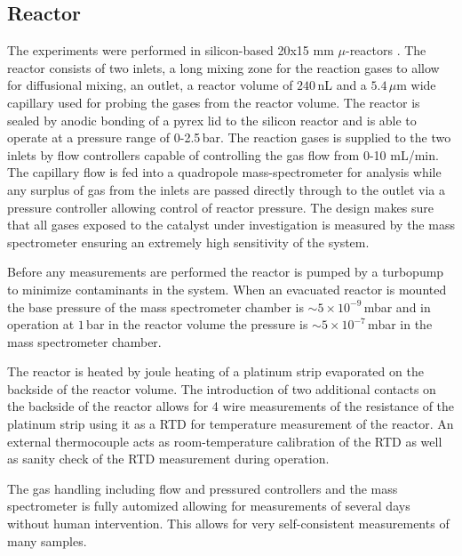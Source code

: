 \documentclass[8.5pt,twoside,twocolumn]{article}
\begin{document}
\subsection{Reactor}
The experiments were performed in silicon-based 20x15 mm $\mu$-reactors \cite{Henriksen2009}. The reactor consists of two inlets, a long mixing zone for the reaction gases to allow for diffusional mixing, an outlet, a reactor volume of $240\,$nL and a $5.4\,\mu$m wide capillary used for probing the gases from the reactor volume. The reactor is sealed by anodic bonding of a pyrex lid to the silicon reactor and is able to operate at a pressure range of 0-2.5\,bar. The reaction gases is supplied to the two inlets by flow controllers capable of controlling the gas flow from 0-10 mL/min. The capillary flow is fed into a quadropole mass-spectrometer for analysis while any surplus of gas from the inlets are passed directly through to the outlet via a pressure controller allowing control of reactor pressure. The design makes sure that all gases exposed to the catalyst under investigation is measured by the mass spectrometer ensuring an extremely high sensitivity of the system. 

Before any measurements are performed the reactor is pumped by a turbopump to minimize contaminants in the system. When an evacuated reactor is mounted the base pressure of the mass spectrometer chamber is $\sim5\times10^{-9}\,$mbar and in operation at $1\,$bar in the reactor volume the pressure is $\sim5\times10^{-7}\,$mbar in the mass spectrometer chamber. 

The reactor is heated by joule heating of a platinum strip evaporated on the backside of the reactor volume. The introduction of two additional contacts on the backside of the reactor allows for 4 wire measurements of the resistance of the platinum strip using it as a RTD for temperature measurement of the reactor. An external thermocouple acts as room-temperature calibration of the RTD as well as sanity check of the RTD measurement during operation.

The gas handling including flow and pressured controllers and the mass spectrometer is fully automized allowing for measurements of several days without human intervention. This allows for very self-consistent measurements of many samples.
\end{document}

